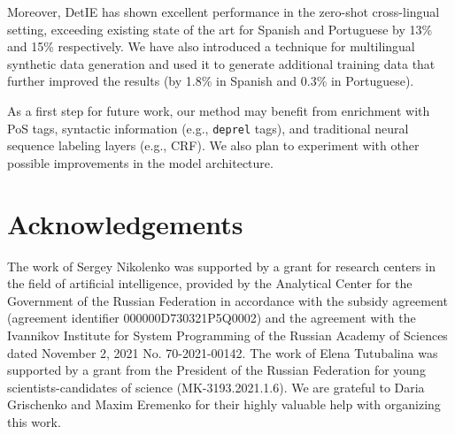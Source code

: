 \documentclass[letterpaper]{article} \usepackage{aaai22}  \usepackage{times}  \usepackage{helvet}  \usepackage{courier}  \usepackage[hyphens]{url}  \usepackage{graphicx} \usepackage{placeins}
\begin{document}
Moreover, DetIE has shown excellent performance in the zero-shot cross-lingual setting, exceeding existing state of the art for Spanish and Portuguese by 13\% and 15\% respectively. We have also introduced a technique for multilingual synthetic data generation and used it to generate additional training data that further improved the results (by 1.8\% in Spanish and 0.3\% in Portuguese).

As a first step for future work, our method may benefit from enrichment with PoS tags, syntactic information (e.g., {\tt deprel} tags), and traditional neural sequence labeling layers (e.g., CRF). We also plan to experiment with other possible improvements in the model architecture.

\section*{Acknowledgements}

The work of Sergey Nikolenko was supported by a grant for research centers in the field of artificial intelligence, provided by the Analytical Center for the Government of the Russian Federation in accordance with the subsidy agreement (agreement identifier 000000D730321P5Q0002) and the agreement with the Ivannikov Institute for System Programming of the Russian Academy of Sciences dated November 2, 2021 No. 70-2021-00142. The work of Elena Tutubalina was supported by a grant from the President of the Russian Federation for young scientists-candidates of science (MK-3193.2021.1.6). We are grateful to Daria Grischenko and Maxim Eremenko for their highly valuable help with organizing this work.


\FloatBarrier




\end{document}
